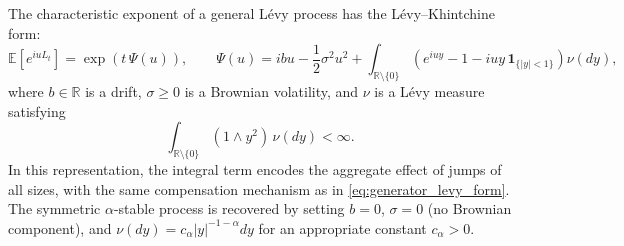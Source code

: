 \documentclass[11pt]{article}
\begin{document}
The characteristic exponent of a general L\'evy process has the L\'evy--Khintchine form:
\begin{equation}\label{eq:levy_khintchine}
{\mathbb E}\!\left[e^{iuL_t}\right]
=
\exp\!\left(
t\,\Psi(u)
\right),
\qquad
\Psi(u)
=
i b u
-\frac{1}{2}\sigma^2 u^2
+
\int_{\mathbb R\setminus\{0\}}
\left(e^{iuy}-1-iuy\,\mathbf 1_{\{|y|<1\}}\right)\nu(dy),
\end{equation}
where $b\in\mathbb R$ is a drift, $\sigma\ge 0$ is a Brownian volatility, and $\nu$ is a L\'evy measure satisfying
\begin{equation}\label{eq:levy_measure_condition}
\int_{\mathbb R\setminus\{0\}} (1\wedge y^2)\,\nu(dy) < \infty.
\end{equation}
In this representation, the integral term encodes the aggregate effect of jumps of all sizes, with the same compensation mechanism as in \eqref{eq:generator_levy_form}. The symmetric $\alpha$-stable process is recovered by setting $b=0$, $\sigma=0$ (no Brownian component), and $\nu(dy)=c_\alpha |y|^{-1-\alpha}dy$ for an appropriate constant $c_\alpha>0$.
\end{document}
